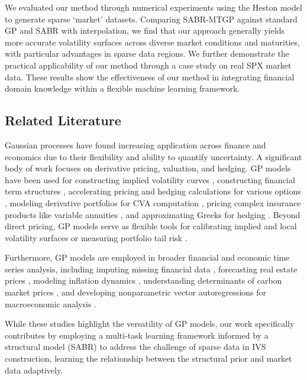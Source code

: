 \documentclass[preprint,12pt]{elsarticle}
\begin{document}
We evaluated our method through numerical experiments using the Heston model \citep{heston1993closed} to generate sparse `market' datasets. Comparing SABR-MTGP against standard GP and SABR with interpolation, we find that our approach generally yields more accurate volatility surfaces across diverse market conditions and maturities, with particular advantages in sparse data regions. We further demonstrate the practical applicability of our method through a case study on real SPX market data. These results show the effectiveness of our method in integrating financial domain knowledge within a flexible machine learning framework.

\subsection*{Related Literature}
Gaussian processes have found increasing application across finance and economics due to their flexibility and ability to quantify uncertainty. A significant body of work focuses on derivative pricing, valuation, and hedging. GP models have been used for constructing implied volatility curves \citep{Spiegeleer2018,roberts2021probabilistic}, constructing financial term structures \citep{Cousin2016}, accelerating pricing and hedging calculations for various options \citep{Spiegeleer2018, Ludkovski2018, goudenege2020machine, li2022effect, hocht2024pricing}, modeling derivative portfolios for CVA computation \citep{Crepey2020}, pricing complex insurance products like variable annuities \citep{goudenege2021gaussian}, and approximating Greeks for hedging \citep{ludkovski2021}. Beyond direct pricing, GP models serve as flexible tools for calibrating implied and local volatility surfaces \citep{roberts2021probabilistic,chataigner2021beyond} or measuring portfolio tail risk \citep{risk2018sequential}. 

Furthermore, GP models are employed in broader financial and economic time series analysis, including imputing missing financial data \citep{de2020gaussian}, forecasting real estate prices \citep{xu2023gaussian}, modeling inflation dynamics \citep{clark2024forecasting}, understanding determinants of carbon market prices \citep{salvagnin2024investigating}, and developing nonparametric vector autoregressions for macroeconomic analysis \citep{hauzenberger2025gaussian}. 

While these studies highlight the versatility of GP models, our work specifically contributes by employing a multi-task learning framework informed by a structural model (SABR) to address the challenge of sparse data in IVS construction, learning the relationship between the structural prior and market data adaptively.
\end{document}
